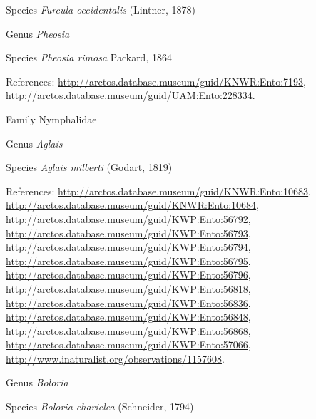 \documentclass[9pt, article]{memoir}
\begin{document}
\begin{multicols}{2}
\vspace{6pt}\noindent\hspace{36pt}Species \textit{Furcula occidentalis} (Lintner, 1878)


\vspace{6pt}\noindent\hspace{30pt}Genus \textit{Pheosia}


\vspace{6pt}\noindent\hspace{36pt}Species \textit{Pheosia rimosa} Packard, 1864


\vspace{6pt}References: 
\url{http://arctos.database.museum/guid/KNWR:Ento:7193}, 
\url{http://arctos.database.museum/guid/UAM:Ento:228334}.

\vspace{6pt}\noindent\hspace{24pt}Family Nymphalidae


\vspace{6pt}\noindent\hspace{30pt}Genus \textit{Aglais}


\vspace{6pt}\noindent\hspace{36pt}Species \textit{Aglais milberti} (Godart, 1819)


\vspace{6pt}References: 
\url{http://arctos.database.museum/guid/KNWR:Ento:10683}, 
\url{http://arctos.database.museum/guid/KNWR:Ento:10684}, 
\url{http://arctos.database.museum/guid/KWP:Ento:56792}, 
\url{http://arctos.database.museum/guid/KWP:Ento:56793}, 
\url{http://arctos.database.museum/guid/KWP:Ento:56794}, 
\url{http://arctos.database.museum/guid/KWP:Ento:56795}, 
\url{http://arctos.database.museum/guid/KWP:Ento:56796}, 
\url{http://arctos.database.museum/guid/KWP:Ento:56818}, 
\url{http://arctos.database.museum/guid/KWP:Ento:56836}, 
\url{http://arctos.database.museum/guid/KWP:Ento:56848}, 
\url{http://arctos.database.museum/guid/KWP:Ento:56868}, 
\url{http://arctos.database.museum/guid/KWP:Ento:57066}, 
\url{http://www.inaturalist.org/observations/1157608}.

\vspace{6pt}\noindent\hspace{30pt}Genus \textit{Boloria}


\vspace{6pt}\noindent\hspace{36pt}Species \textit{Boloria chariclea} (Schneider, 1794)



\end{multicols}
\end{document}
